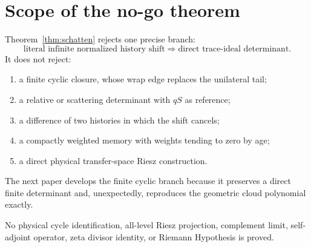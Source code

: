 \documentclass[12pt]{article}
\theoremstyle{remark}
\begin{document}
\section{Scope of the no-go theorem}

Theorem~\ref{thm:schatten} rejects one precise branch:
\[
 \text{literal infinite normalized history shift}
 \Longrightarrow
 \text{direct trace-ideal determinant}.
\]
It does not reject:
\begin{enumerate}[leftmargin=2em]
\item a finite cyclic closure, whose wrap edge replaces the unilateral tail;
\item a relative or scattering determinant with $qS$ as reference;
\item a difference of two histories in which the shift cancels;
\item a compactly weighted memory with weights tending to zero by age;
\item a direct physical transfer-space Riesz construction.
\end{enumerate}
The next paper develops the finite cyclic branch because it preserves a
direct finite determinant and, unexpectedly, reproduces the geometric cloud
polynomial exactly.

No physical cycle identification, all-level Riesz projection, complement
limit, self-adjoint operator, zeta divisor identity, or Riemann Hypothesis is
proved.



\end{document}
